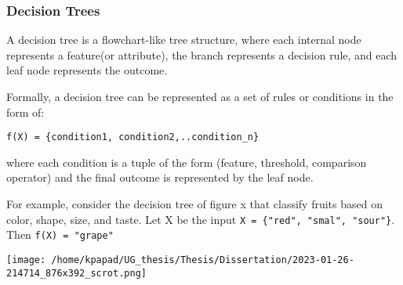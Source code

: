 \documentclass[11pt,a4paper]{article}
\begin{document}
\subsubsection{Decision Trees}
\label{sec:org01d11f2}
A decision tree is a flowchart-like tree structure, where each internal node represents a feature(or attribute), the branch represents a decision rule, and each leaf node represents the outcome.

Formally, a decision tree can be represented as a set of rules or conditions in the form of:

\texttt{f(X) = \{condition1, condition2,..condition\_n\}}

where each condition is a tuple of the form (feature, threshold, comparison operator) and the final outcome is represented by the leaf node.

For example, consider the decision tree of figure x that classify fruits based on color, shape, size, and taste. Let X be the input \texttt{X = \{"red", "smal", "sour"\}}. Then \texttt{f(X) = "grape"} 
\begin{center}
\texttt{[image: /home/kpapad/UG\_thesis/Thesis/Dissertation/2023-01-26-214714\_876x392\_scrot.png]}
\end{center} 
\end{document}
